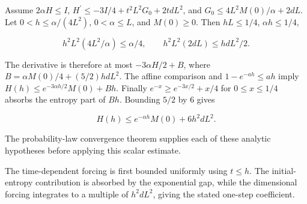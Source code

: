 \documentclass[11pt,a4paper]{report}
\begin{document}
Assume \(2\alpha H\le I\), \(H^{\prime}\le-3I/4+t^2L^2G_0+2tdL^2\), and \(G_0\le4L^2M(0)/\alpha+2dL\). Let \(0<h\le\alpha/(4L^2)\), \(0<\alpha\le L\), and \(M(0)\ge0\). Then \(hL\le1/4\), \(\alpha h\le1/4\),

\[h^2L^2(4L^2/\alpha)\le\alpha/4,\qquad h^2L^2(2dL)\le hdL^2/2.\]

The derivative is therefore at most \(-3\alpha H/2+B\), where \(B=\alpha M(0)/4+(5/2)hdL^2\). The affine comparison and \(1-e^{-ah}\le ah\) imply \(H(h)\le e^{-3\alpha h/2}M(0)+Bh\). Finally \(e^{-x}\ge e^{-3x/2}+x/4\) for \(0\le x\le1/4\) absorbs the entropy part of \(Bh\). Bounding \(5/2\) by 6 gives

\[H(h)\le e^{-\alpha h}M(0)+6h^2dL^2.\]

The probability-law convergence theorem supplies each of these analytic hypotheses before applying this scalar estimate.



The time-dependent forcing is first bounded uniformly using \(t\le h\). The initial-entropy contribution is absorbed by the exponential gap, while the dimensional forcing integrates to a multiple of \(h^2dL^2\), giving the stated one-step coefficient.
\end{document}

